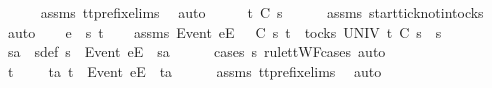 \begin{isabellebody}
\ \ \ \ \isamarkupfalse%
\ assms{\isacharparenleft}{}{\isacharparenright}\ tt{\isacharunderscore}prefix{\isachardot}elims{\isacharparenleft}{}{\isacharparenright}\ \isamarkupfalse%
\ auto\isanewline
\ \ \isamarkupfalse%
\ \isamarkupfalse%
\ {\isachardoublequoteopen}t\ {\isasymle}\isactrlsub C\ s{}{\isacharprime}{\isachardoublequoteclose}\isanewline
\ \ \ \ \isamarkupfalse%
\ assms{\isacharparenleft}{}{\isacharparenright}\ start{\isacharunderscore}tick{\isacharunderscore}notin{\isacharunderscore}tocks\ \isamarkupfalse%
\ auto\isanewline
{}\isamarkupfalse%
\isanewline
\ \ \isamarkupfalse%
\ e\ {\isasymsigma}\ s{}{\isacharprime}\ t\isanewline
\ \ \isamarkupfalse%
\ assms{\isacharcolon}\ {\isachardoublequoteopen}{\isacharbrackleft}Event\ e{\isacharbrackright}\isactrlsub E\ {\isacharhash}\ {\isasymsigma}\ {\isasymsubseteq}\isactrlsub C\ s{}{\isacharprime}{\isachardoublequoteclose}\ {\isachardoublequoteopen}t\ {\isasymin}\ tocks\ UNIV{\isachardoublequoteclose}\ {\isachardoublequoteopen}t\ {\isasymle}\isactrlsub C\ s{}{\isacharprime}\ {\isacharat}\ s{}{\isachardoublequoteclose}\isanewline
\ \ \isamarkupfalse%
\ \isamarkupfalse%
\ s{}{\isacharprime}a\ \ s{}{\isacharprime}{\isacharunderscore}def{\isacharcolon}\ {\isachardoublequoteopen}s{}{\isacharprime}\ {\isacharequal}\ {\isacharbrackleft}Event\ e{\isacharbrackright}\isactrlsub E\ {\isacharhash}\ s{}{\isacharprime}a{\isachardoublequoteclose}\isanewline
\ \ \ \ \isamarkupfalse%
\ {\isacharparenleft}cases\ s{}{\isacharprime}\ rule{\isacharcolon}ttWF{\isachardot}cases{\isacharcomma}\ auto{\isacharparenright}\isanewline
\ \ \isamarkupfalse%
\ \isamarkupfalse%
\ {\isachardoublequoteopen}t\ {\isacharequal}\ {\isacharbrackleft}{\isacharbrackright}\ {\isasymor}\ {\isacharparenleft}{\isasymexists}\ ta{\isachardot}\ t\ {\isacharequal}\ {\isacharbrackleft}Event\ e{\isacharbrackright}\isactrlsub E\ {\isacharhash}\ ta{\isacharparenright}{\isachardoublequoteclose}\isanewline
\ \ \ \ \isamarkupfalse%
\ assms{\isacharparenleft}{}{\isacharparenright}\ tt{\isacharunderscore}prefix{\isachardot}elims{\isacharparenleft}{}{\isacharparenright}\ \isamarkupfalse%
\ auto\isanewline

\end{isabellebody}
